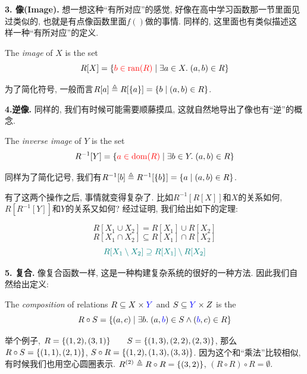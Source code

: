 \vspace*{1pt}
\textbf{3. 像(Image). } 想一想这种``有所对应''的感觉, 好像在高中学习函数那一节里面见过类似的, 也就是有点像函数里面$f()$做的事情.  同样的, 这里面也有类似描述这样一种``有所对应''的定义. 

\begin{definition}[像 (Image)]
  The {\it image} of $X$  is the set
  \[
    R[X] = \{\textcolor{red}{b \in \text{ran}(R)} \mid \exists a \in X.\; (a, b) \in R\}
  \]
\end{definition}
为了简化符号, 一般而言$R[a] \triangleq R[\{a\}] = \{b \mid (a, b) \in R\}$. 


\textbf{4.逆像. } 同样的, 我们有时候可能需要顺藤摸瓜, 这就自然地导出了像也有``逆''的概念. 

\begin{definition}
  The {\it inverse image} of $Y$  is the set
  \[
    R^{-1}[Y] = \{\textcolor{red}{a \in \text{dom}(R)} \mid \exists b \in Y.\; (a, b) \in R\}
  \]
\end{definition}
同样为了简化记号, 我们有$R^{-1}[b] \triangleq R^{-1}[\{b\}] = \{a \mid (a, b) \in R\}$. 

有了这两个操作之后, 事情就变得复杂了. 比如$R^{-1}[R[X]] $和$ X$的关系如何, $R[R^{-1}[Y]]$和$Y$的关系又如何? 经过证明, 我们给出如下的定理: 
  
\begin{theorem}
  \[
    R[X_1 \cup X_2] = R[X_1] \cup R[X_2]
  \]
  \[
    R[X_1 \cap X_2] \subseteq R[X_1] \cap R[X_2]
  \]
  \[
    \textcolor{teal}{R[X_1 \setminus X_2] \supseteq R[X_1] \setminus R[X_2]}
  \]
\end{theorem}


\textbf{5. 复合. } 像复合函数一样, 这是一种构建复杂系统的很好的一种方法. 因此我们自然给出定义: 
\begin{definition}
  The {\it composition} of relations $R \subseteq X \times \textcolor{blue}{Y}$
  and $S \subseteq \textcolor{blue}{Y} \times Z$ is the 
  \[
    R \circ S = \{(a, c) \mid \exists b.\; (a, \textcolor{blue}{b}) \in S \land (\textcolor{blue}{b}, c) \in R\}
  \]
\end{definition}

举个例子, $R = \{(1, 2), (3, 1)\} \qquad S = \{(1, 3), (2, 2), (2, 3)\}$, 那么$R \circ S = \{(1, 1), (2, 1)\}$, $S \circ R = \{(1, 2), (1, 3), (3, 3)\}$. 因为这个和``乘法''比较相似, 有时候我们也用空心圆圈表示. $R^{(2)} \triangleq R \circ R = \{(3, 2)\}$, $ (R \circ R) \circ R =  \emptyset$. 

